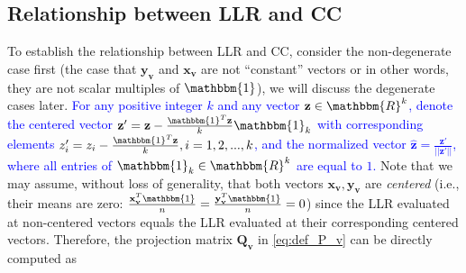 \subsection{Relationship between LLR and CC}
To establish the relationship between LLR and CC, consider the non-degenerate case first (the case that $\mathbf{y}_{\mathbf{v}}$ and $\mathbf{x}_{\mathbf{v}}$ are not ``constant'' vectors or in other words, they are not scalar multiples of $\mathbbm{1}$), we will discuss the degenerate cases later. \textcolor{blue}{For any positive integer $k$ and any vector $\mathbf{z}\in \mathbbm{R}^{k}$, denote the centered vector $\mathbf{z}' = \mathbf{z} - \frac{\mathbbm{1}^{T}\mathbf{z}}{k}\mathbbm{1}_{k}$ with corresponding elements $z_{i}'=z_{i} - \frac{\mathbbm{1}^{T}\mathbf{z}}{k}, i=1,2,...,k$, and the normalized vector $\widehat{\mathbf{z}} = \frac{\mathbf{z}'}{||\mathbf{z}'||}$, where all entries of $\mathbbm{1}_{k}\in \mathbbm{R}^{k}$ are equal to $1$.} Note that we may assume, without loss of generality, that both vectors $\mathbf{x}_{\mathbf{v}}, \mathbf{y}_{\mathbf{v}}$ are \emph{centered} (i.e., their means are zero: $\frac{\mathbf{x}_{\mathbf{v}}^{T}\mathbbm{1}}{n} = \frac{\mathbf{y}_{\mathbf{v}}^{T}\mathbbm{1}}{n} = 0$) since the LLR evaluated at non-centered vectors equals the LLR evaluated at their corresponding centered vectors. Therefore, the projection matrix $\mathbf{Q}_{\mathbf{v}}$ in \eqref{eq:def_P_v} can be directly computed as
